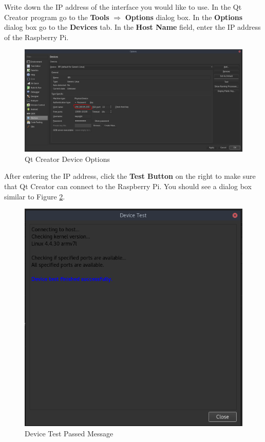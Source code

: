 \documentclass{article}
\begin{document}
Write down the IP address of the interface you would like to use. In the Qt Creator program go to the \textbf{Tools} $\Rightarrow$ \textbf{Options} dialog box. In the \textbf{Options} dialog box go to the \textbf{Devices} tab. In the \textbf{Host Name} field, enter the IP address of the Raspberry Pi.


	\begin{figure}[H]
		\centering
		\includegraphics[scale=0.5]{pics/Qt_Options_Devices.png}
		\caption{Qt Creator Device Options}
		\label{Qt_Options_Devices}
	\end{figure}

After entering the IP address, click the \textbf{Test Button} on the right to make sure that Qt Creator can connect to the Raspberry Pi. You should see a dialog box similar to Figure \ref{Device_Test_Dialog}.

	\begin{figure}[H]
		\centering
		\includegraphics[scale=0.5]{pics/Device_Test_Dialog.png}
		\caption{Device Test Passed Message}
		\label{Device_Test_Dialog}
	\end{figure}
\end{document}
